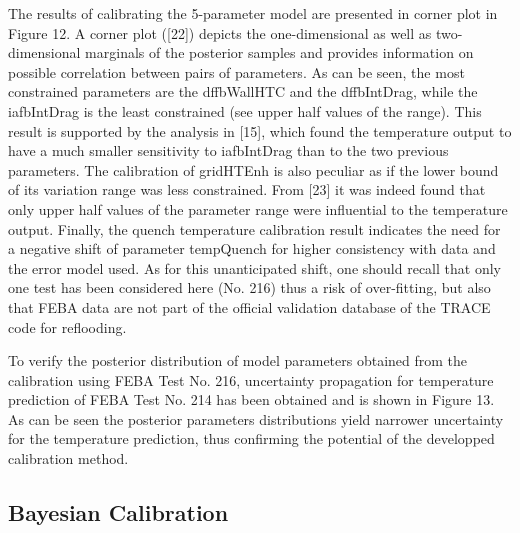 \documentclass[11pt,titlepage]{article}
\begin{document}

The results of calibrating the 5-parameter model are presented in corner plot in Figure 12. A corner plot ([22]) depicts the one-dimensional as well as two-dimensional marginals of the posterior samples and provides information on possible correlation between pairs of parameters. As can be seen, the most constrained parameters are the dffbWallHTC and the dffbIntDrag, while the iafbIntDrag is the least constrained (see upper half values of the range). This result is supported by the analysis in [15], which found the temperature output to have a much smaller sensitivity to iafbIntDrag than to the two previous parameters. The calibration of gridHTEnh is also peculiar as if the lower bound of its variation range was less constrained. From [23] it was indeed found that only upper half values of the parameter range were influential to the temperature output. Finally, the quench temperature calibration result indicates the need for a negative shift of parameter tempQuench for higher consistency with data and the error model used. As for this unanticipated shift, one should recall that only one test has been considered here (No. 216) thus a risk of over-fitting, but also that FEBA data are not part of the official validation database of the TRACE code for reflooding. 



To verify the posterior distribution of model parameters obtained from the calibration using FEBA Test No. 216, uncertainty propagation for temperature prediction of FEBA Test No. 214 has been obtained and is shown in Figure 13. As can be seen the posterior parameters distributions yield narrower uncertainty for the temperature prediction, thus confirming the potential of the developped calibration method.


\subsection{Bayesian Calibration}
\end{document}
